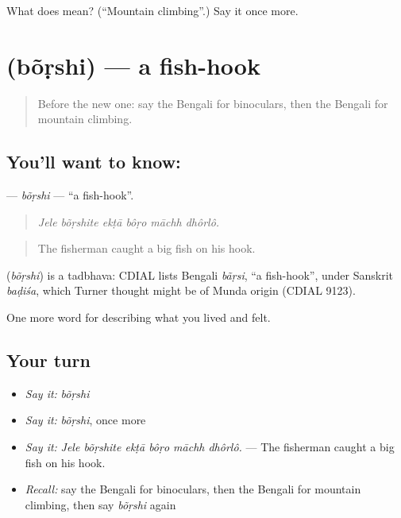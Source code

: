 \begin{tcolorbox}[breakable,colback=teal!4,colframe=teal!35!black,title={Before you move on}]
What does  mean? (\textquotedblleft{}Mountain climbing\textquotedblright{}.) Say it once more.
\end{tcolorbox}
\section[\texorpdfstring{\bn{বঁড়শি} (bõṛshi)}{বঁড়শি (bõṛshi)}]{ (bõṛshi) — a fish-hook}

\label{lesson:BN-C523-borshi}



\begin{quote}
Before the new one: say the Bengali for binoculars, then the Bengali for mountain climbing.
\end{quote}

\subsection*{You'll want to know: }
\textbf{} — \emph{bõṛshi} — \textquotedblleft{}a fish-hook\textquotedblright{}.

\begin{quote}
     
\end{quote}

\begin{quote}
\emph{Jele bõṛshite ekṭā bôṛo māchh dhôrlô.}
\end{quote}

\begin{quote}
The fisherman caught a big fish on his hook.
\end{quote}

\begin{cousinweb}
\textbf{} (\emph{bõṛshi}) is a tadbhava: CDIAL lists Bengali \emph{bãṛsi}, \textquotedblleft{}a fish-hook\textquotedblright{}, under Sanskrit \emph{baḍiśa}, which Turner thought might be of Munda origin (CDIAL 9123).
\end{cousinweb}

\begin{grammarlens}[title={What you've built}]
One more word for describing what you lived and felt.
\end{grammarlens}

\subsection*{Your turn}
\begin{itemize}
\raggedright
  \item \emph{Say it:} \emph{bõṛshi}
  \item \emph{Say it:} \emph{bõṛshi}, once more
  \item \emph{Say it:} \emph{Jele bõṛshite ekṭā bôṛo māchh dhôrlô.} — The fisherman caught a big fish on his hook.
  \item \emph{Recall:} say the Bengali for binoculars, then the Bengali for mountain climbing, then say \emph{bõṛshi} again
\end{itemize}

